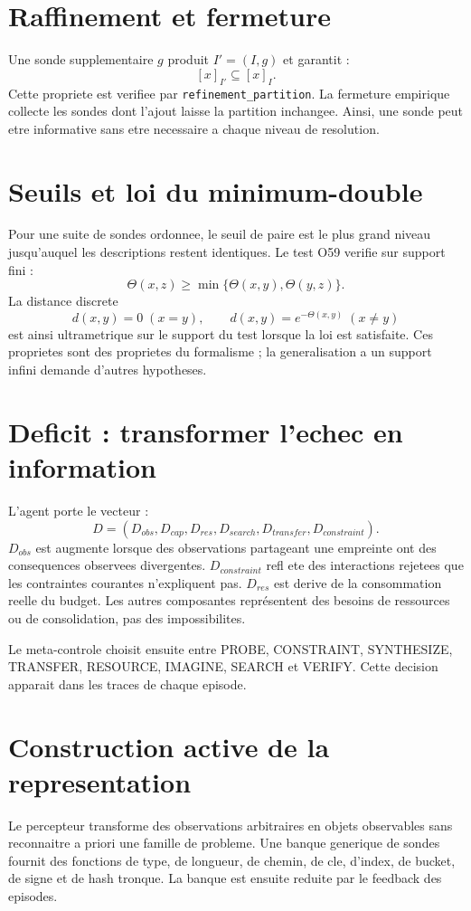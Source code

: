 \documentclass[11pt,a4paper]{article}
\begin{document}
\section{Raffinement et fermeture}
Une sonde supplementaire $g$ produit $I'=(I,g)$ et garantit :
\[
[x]_{I'}\subseteq[x]_I.
\]
Cette propriete est verifiee par \texttt{refinement\_partition}. La fermeture empirique collecte les sondes dont l'ajout laisse la partition inchangee. Ainsi, une sonde peut etre informative sans etre necessaire a chaque niveau de resolution.

\section{Seuils et loi du minimum-double}
Pour une suite de sondes ordonnee, le seuil de paire est le plus grand niveau jusqu'auquel les descriptions restent identiques. Le test O59 verifie sur support fini :
\[
\Theta(x,z)\geq\min\{\Theta(x,y),\Theta(y,z)\}.
\]
La distance discrete
\[
d(x,y)=0\;(x=y),\qquad d(x,y)=e^{-\Theta(x,y)}\;(x\neq y)
\]
est ainsi ultrametrique sur le support du test lorsque la loi est satisfaite. Ces proprietes sont des proprietes du formalisme ; la generalisation a un support infini demande d'autres hypotheses.

\section{Deficit : transformer l'echec en information}
L'agent porte le vecteur :
\[
D=(D_{obs},D_{cap},D_{res},D_{search},D_{transfer},D_{constraint}).
\]
$D_{obs}$ est augmente lorsque des observations partageant une empreinte ont des consequences observees divergentes. $D_{constraint}$ refl ete des interactions rejetees que les contraintes courantes n'expliquent pas. $D_{res}$ est derive de la consommation reelle du budget. Les autres composantes représentent des besoins de ressources ou de consolidation, pas des impossibilites.

Le meta-controle choisit ensuite entre PROBE, CONSTRAINT, SYNTHESIZE, TRANSFER, RESOURCE, IMAGINE, SEARCH et VERIFY. Cette decision apparait dans les traces de chaque episode.

\section{Construction active de la representation}
Le percepteur transforme des observations arbitraires en objets observables sans reconnaitre a priori une famille de probleme. Une banque generique de sondes fournit des fonctions de type, de longueur, de chemin, de cle, d'index, de bucket, de signe et de hash tronque. La banque est ensuite reduite par le feedback des episodes.
\end{document}
